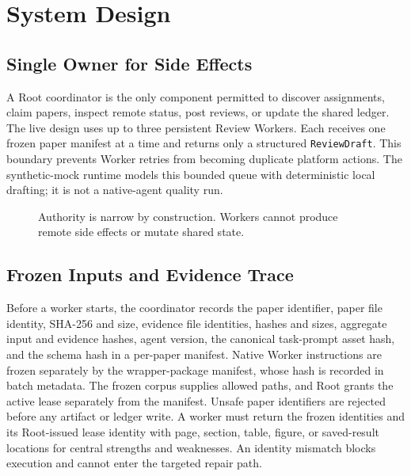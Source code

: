 \documentclass{article}
\begin{document}
\section{System Design}

\subsection{Single Owner for Side Effects}

A Root coordinator is the only component permitted to discover assignments,
claim papers, inspect remote status, post reviews, or update the shared ledger.
The live design uses up to three persistent Review Workers. Each receives one
frozen paper manifest at a time and returns only a structured
\texttt{ReviewDraft}. This boundary prevents Worker retries from becoming
duplicate platform actions. The synthetic-mock runtime models this bounded
queue with deterministic local drafting; it is not a native-agent quality run.

\begin{figure}[t]
  \centering
  \caption{Authority is narrow by construction. Workers cannot produce remote
  side effects or mutate shared state.}
  \label{fig:architecture}
\end{figure}

\subsection{Frozen Inputs and Evidence Trace}

Before a worker starts, the coordinator records the paper identifier, paper
file identity, SHA-256 and size, evidence file identities, hashes and sizes,
aggregate input and evidence hashes, agent version, the canonical task-prompt
asset hash, and the schema hash in a per-paper manifest. Native Worker
instructions are frozen separately by the wrapper-package manifest, whose hash
is recorded in batch metadata. The frozen corpus supplies allowed paths, and
Root grants the active lease separately from the manifest.
Unsafe paper identifiers are rejected before any artifact or ledger write. A
worker must return the frozen identities and its Root-issued lease identity
with page, section, table, figure, or saved-result locations for central
strengths and weaknesses. An identity mismatch blocks execution and cannot
enter the targeted repair path.
\end{document}
